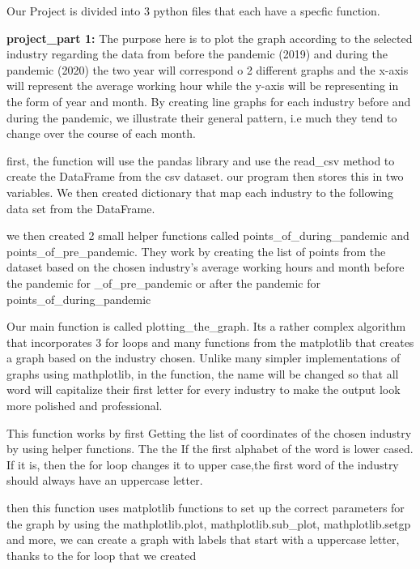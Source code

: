 \documentclass[fontsize=11pt]{article}
\begin{document}
Our Project is divided into 3 python files that each have a specfic function.

\medskip   

\textbf{project\_part 1:} The purpose here is to plot the graph according to the selected industry regarding the data from before the pandemic (2019) and during the pandemic (2020) the two year will correspond o 2 different graphs and the x-axis will represent the average working hour while the y-axis
will be representing in the form of year and month. By creating line graphs for each industry before and during the pandemic, we illustrate their general pattern, i.e  much they tend to change over the course of each month. 

\medskip 


first, the function will use the pandas library and use the read\_csv method to create the DataFrame from the csv dataset. our program then stores this in
two variables.
We then created dictionary that map each industry  to the following data set from the DataFrame.

we then created 2 small helper functions called points\_of\_during\_pandemic
and points\_of\_pre\_pandemic. They work by creating the list of points from the dataset based on the chosen industry's average working hours and month before the pandemic for \_of\_pre\_pandemic or after the pandemic for points\_of\_during\_pandemic

Our main function is called plotting\_the\_graph. Its a rather complex algorithm that incorporates 3 for loops and many functions from the matplotlib that creates a graph based on the industry chosen. Unlike many simpler implementations of graphs using mathplotlib, in the function, the name will be changed so that all word will capitalize their first letter for every industry to make the output look more polished and professional.

This function works by first Getting the list of coordinates of the chosen industry by using helper functions. The the If the first alphabet of the word is lower cased. If it is, then the for loop changes it to upper case,the first word of the industry should always have an uppercase letter.


then this function uses matplotlib functions to set up the correct parameters for the graph by using the mathplotlib.plot, mathplotlib.sub\_plot, mathplotlib.setgp and more, we can create a graph with labels that start with a uppercase letter, thanks to the for loop that we created
\end{document}
